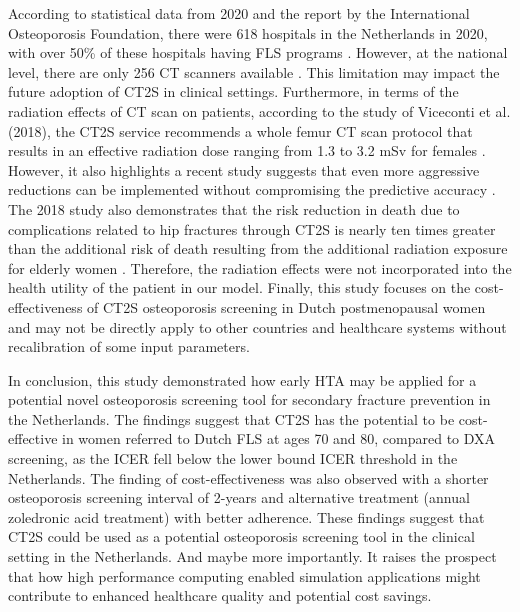 According to statistical data from 2020 and the report by the International Osteoporosis Foundation, there were 618 hospitals in the Netherlands in 2020, with over 50\% of these hospitals having FLS programs \cite{4-82,4-83}. However, at the national level, there are only 256 CT scanners available \cite{4-84}. This limitation may impact the future adoption of CT2S in clinical settings. Furthermore, in terms of the radiation effects of CT scan on patients, according to the study of Viceconti et al. (2018), the CT2S service recommends a whole femur CT scan protocol that results in an effective radiation dose ranging from 1.3 to 3.2 mSv for females \cite{4-4}. However, it also highlights a recent study suggests that even more aggressive reductions can be implemented without compromising the predictive accuracy \cite{4-85}. The 2018 study also demonstrates that the risk reduction in death due to complications related to hip fractures through CT2S is nearly ten times greater than the additional risk of death resulting from the additional radiation exposure for elderly women \cite{4-4}. Therefore, the radiation effects were not incorporated into the health utility of the patient in our model. Finally, this study focuses on the cost-effectiveness of CT2S osteoporosis screening in Dutch postmenopausal women and may not be directly apply to other countries and healthcare systems without recalibration of some input parameters.

In conclusion, this study demonstrated how early HTA may be applied for a potential novel osteoporosis screening tool for secondary fracture prevention in the Netherlands. The findings suggest that CT2S has the potential to be cost-effective in women referred to Dutch FLS at ages 70 and 80, compared to DXA screening, as the ICER fell below the lower bound ICER threshold in the Netherlands. The finding of cost-effectiveness was also observed with a shorter osteoporosis screening interval of 2-years and alternative treatment (annual zoledronic acid treatment) with better adherence. These findings suggest that CT2S could be used as a potential osteoporosis screening tool in the clinical setting in the Netherlands. And maybe more importantly. It raises the prospect that how high performance computing enabled simulation applications might contribute to enhanced healthcare quality and potential cost savings.







